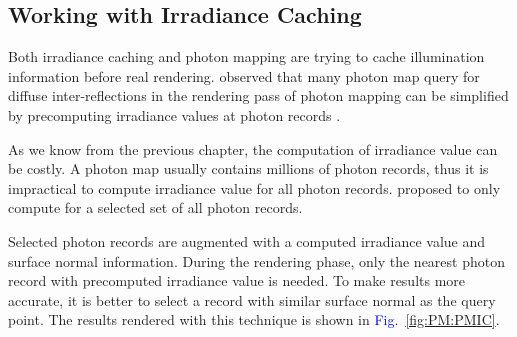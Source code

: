 \documentclass[]{book}
\renewcommand{\figurename}{\textcolor{blue}{Fig.\ }}
\begin{document}
\subsection{Working with Irradiance Caching}
\label{sec:PM:more:withIC}
Both irradiance caching and photon mapping are trying to cache illumination information before real rendering.
\citeauthor{christensen1999faster} observed that many photon map query for diffuse inter-reflections in the rendering pass of photon mapping can be simplified by precomputing irradiance values at photon records \cite{christensen1999faster}.

As we know from the previous chapter, the computation of irradiance value can be costly.
A photon map usually contains millions of photon records, thus it is impractical to compute irradiance value for all photon records.
\citeauthor{christensen1999faster} proposed to only compute for a selected set of all photon records.

Selected photon records are augmented with a computed irradiance value and surface normal information.
During the rendering phase, only the nearest photon record with precomputed irradiance value is needed.
To make results more accurate, it is better to select a record with similar surface normal as the query point.
The results rendered with this technique is shown in \figurename \ref{fig:PM:PMIC}.
\end{document}
